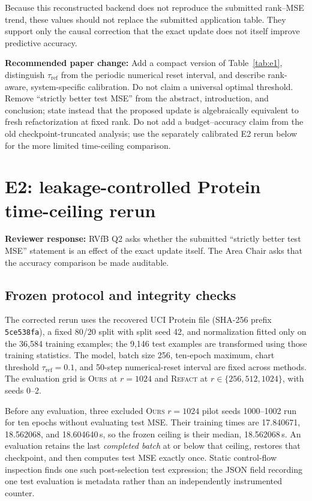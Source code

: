 \documentclass[11pt]{article}
\newcommand{\ours}{\textsc{Ours}}
\newcommand{\refact}{\textsc{Refact}}
\newcommand{\tref}{\tau_{\mathrm{ref}}}
\newcommand{\reviewer}[1]{\textbf{Reviewer response:} #1}
\newcommand{\paperchange}[1]{\textbf{Recommended paper change:} #1}
\begin{document}
Because this reconstructed backend does not reproduce the submitted rank--MSE
trend, these values should not replace the submitted application table.  They
support only the causal correction that the exact update does not itself
improve predictive accuracy.

\paperchange{Add a compact version of Table~\ref{tab:e1}, distinguish
\(\tref\) from the periodic numerical reset interval, and describe
rank-aware, system-specific calibration.  Do not claim a universal optimal
threshold.  Remove ``strictly better test MSE'' from the abstract,
introduction, and conclusion; state instead that the proposed update is
algebraically equivalent to fresh refactorization at fixed rank.  Do not add a
budget--accuracy claim from the old checkpoint-truncated analysis; use the
separately calibrated E2 rerun below for the more limited time-ceiling
comparison.}

\section{E2: leakage-controlled Protein time-ceiling rerun}
\label{sec:e2}

\reviewer{RVfB Q2 asks whether the submitted ``strictly better test MSE''
statement is an effect of the exact update itself.  The Area Chair asks that
the accuracy comparison be made auditable.}

\subsection{Frozen protocol and integrity checks}

The corrected rerun uses the recovered UCI Protein file
(SHA-256 prefix \texttt{5ce538fa}), a fixed 80/20 split with split seed 42,
and normalization fitted only on the 36,584 training examples; the 9,146
test examples are transformed using those training statistics.  The model,
batch size 256, ten-epoch maximum, chart threshold \(\tref=0.1\), and
50-step numerical-reset interval are fixed across methods.  The evaluation
grid is \ours{} at \(r=1024\) and \refact{} at
\(r\in\{256,512,1024\}\), with seeds 0--2.

Before any evaluation, three excluded \ours{} \(r=1024\) pilot seeds
1000--1002 run for ten epochs without evaluating test MSE.  Their training
times are 17.840671, 18.562068, and 18.604640\,s, so the frozen ceiling is
their median, 18.562068\,s.  An evaluation retains the last \emph{completed
batch} at or below that ceiling, restores that checkpoint, and then computes
test MSE exactly once.  Static control-flow inspection finds one such
post-selection test expression; the JSON field recording one test evaluation
is metadata rather than an independently instrumented counter.
\end{document}
